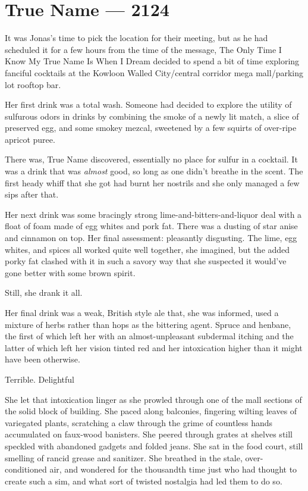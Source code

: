 \hypertarget{true-name-2124}{%
\chapter{True Name — 2124}\label{true-name-2124}}

It was Jonas's time to pick the location for their meeting, but as he had scheduled it for a few hours from the time of the message, The Only Time I Know My True Name Is When I Dream decided to spend a bit of time exploring fanciful cocktails at the Kowloon Walled City/central corridor mega mall/parking lot rooftop bar.

Her first drink was a total wash. Someone had decided to explore the utility of sulfurous odors in drinks by combining the smoke of a newly lit match, a slice of preserved egg, and some smokey mezcal, sweetened by a few squirts of over-ripe apricot puree.

There was, True Name discovered, essentially no place for sulfur in a cocktail. It was a drink that was \emph{almost} good, so long as one didn't breathe in the scent. The first heady whiff that she got had burnt her nostrils and she only managed a few sips after that.

Her next drink was some bracingly strong lime-and-bitters-and-liquor deal with a float of foam made of egg whites and pork fat. There was a dusting of star anise and cinnamon on top. Her final assessment: pleasantly disgusting. The lime, egg whites, and spices all worked quite well together, she imagined, but the added porky fat clashed with it in such a savory way that she suspected it would've gone better with some brown spirit.

Still, she drank it all.

Her final drink was a weak, British style ale that, she was informed, used a mixture of herbs rather than hops as the bittering agent. Spruce and henbane, the first of which left her with an almost-unpleasant subdermal itching and the latter of which left her vision tinted red and her intoxication higher than it might have been otherwise.

Terrible. Delightful

She let that intoxication linger as she prowled through one of the mall sections of the solid block of building. She paced along balconies, fingering wilting leaves of variegated plants, scratching a claw through the grime of countless hands accumulated on faux-wood banisters. She peered through grates at shelves still speckled with abandoned gadgets and folded jeans. She sat in the food court, still smelling of rancid grease and sanitizer. She breathed in the stale, over-conditioned air, and wondered for the thousandth time just who had thought to create such a sim, and what sort of twisted nostalgia had led them to do so.

